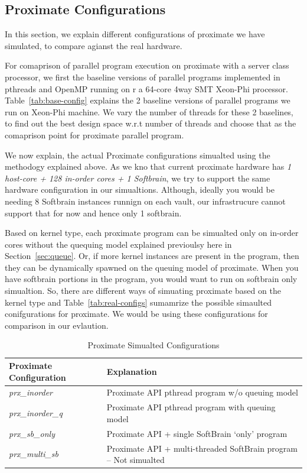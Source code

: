 \subsection{Proximate Configurations}
In this section, we explain different configurations of proximate we have simulated, 
to compare agianst the real hardware. 

For comaprison of parallel program execution on proximate with
a server class processor, we first the baseline versions of parallel programs implemented in pthreads and OpenMP
running on r a 64-core 4way SMT Xeon-Phi processor.
Table~\ref{tab:base-config} explains the 2 baseline versions of parallel programs we run on Xeon-Phi machine.
We vary the number of threads for these 2 baselines, to find out the best design space w.r.t number of threads
and choose that as the comaprison point for proximate parallel program.

We now explain, the actual Proximate configurations simualted using the methodogy explained above. 
As we kno that current proximate hardware has \emph{1 host-core + 128 in-order cores + 1 Softbrain}, we try
to support the same hardware configuration in our simualtions. Although, ideally you would be needing 8 Softbrain 
instances runnign on each vault, our infrastrucure cannot support that for now and hence only 1 softbrain.

Based on kernel type, each proximate program can be simualted only on in-order cores without the quequing model
explained previoulsy here in Section~\ref{sec:queue}. Or, if more kernel instances are present in the program, then they 
can be dynamically spawned on the queuing model of proximate. When you have softbrain portions in the program, 
you would want to run on softbrain only simualtion. So, there are different ways of simuating proximate based on the kernel
type and Table~\ref{tab:real-configs} sumamrize the possible simaulted conifgurations for proximate. We would be using these
configurations for comparison in our evlaution. 


\begin{table}[]
  \centering
  \begin{tabular}{|l|l|}
    \hline
    \textbf{Proximate Configuration}               & \textbf{Explanation}                                                    \\ \hline
    \textit{prx\_inorder}                          & Proximate API pthread program w/o queuing model                         \\ \hline
    \textit{prx\_inorder\_q}                       & Proximate API pthread program with queuing model                        \\ \hline
    \textit{prx\_sb\_only}                         & Proximate API + single SoftBrain ‘only’ program                         \\ \hline
    {\color[HTML]{FE0000} \textit{prx\_multi\_sb}} & {\color[HTML]{FE0000} Proximate API + multi-threaded SoftBrain program -- Not simualted} \\ \hline
  \end{tabular}
  \caption{Proximate Simualted Configurations}
\label{tab"real-configs}
\end{table}
